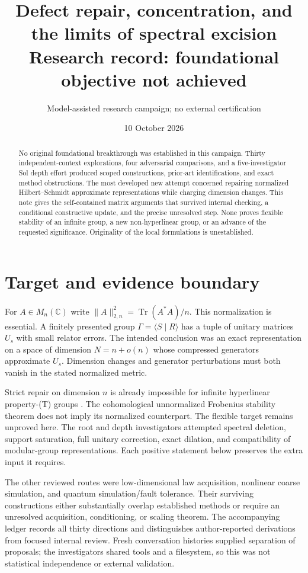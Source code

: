 \documentclass[11pt]{article}
\title{Defect repair, concentration, and the limits of spectral excision\\\large Research record: foundational objective not achieved}
\author{Model-assisted research campaign; no external certification}
\date{10 October 2026}
\newcommand{\tr}{\operatorname{Tr}}
\begin{document}
\maketitle
\begin{abstract}
No original foundational breakthrough was established in this campaign. Thirty independent-context explorations, four adversarial comparisons, and a five-investigator Sol depth effort produced scoped constructions, prior-art identifications, and exact method obstructions. The most developed new attempt concerned repairing normalized Hilbert--Schmidt approximate representations while charging dimension changes. This note gives the self-contained matrix arguments that survived internal checking, a conditional constructive update, and the precise unresolved step. None proves flexible stability of an infinite group, a new non-hyperlinear group, or an advance of the requested significance. Originality of the local formulations is unestablished.
\end{abstract}

\section{Target and evidence boundary}
For $A\in M_n(\mathbb C)$ write $\|A\|_{2,n}^2=\tr(A^*A)/n$. This normalization is essential. A finitely presented group $\Gamma=\langle S\mid R\rangle$ has a tuple of unitary matrices $U_s$ with small relator errors. The intended conclusion was an exact representation on a space of dimension $N=n+o(n)$ whose compressed generators approximate $U_s$. Dimension changes and generator perturbations must both vanish in the stated normalized metric.

Strict repair on dimension $n$ is already impossible for infinite hyperlinear property-(T) groups \cite{BL}. The cohomological unnormalized Frobenius stability theorem \cite{DGLT} does not imply its normalized counterpart. The flexible target remains unproved here. The root and depth investigators attempted spectral deletion, support saturation, full unitary correction, exact dilation, and compatibility of modular-group representations. Each positive statement below preserves the extra input it requires.

The other reviewed routes were low-dimensional law acquisition, nonlinear coarse simulation, and quantum simulation/fault tolerance. Their surviving constructions either substantially overlap established methods or require an unresolved acquisition, conditioning, or scaling theorem. The accompanying ledger records all thirty directions and distinguishes author-reported derivations from focused internal review. Fresh conversation histories supplied separation of proposals; the investigators shared tools and a filesystem, so this was not statistical independence or external validation.
\end{document}
